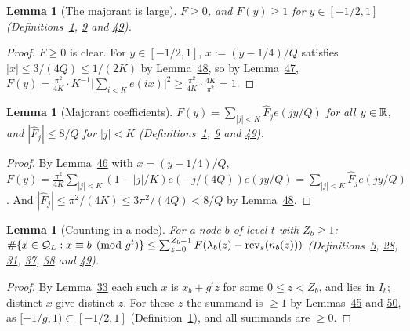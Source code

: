 \documentclass[11pt]{article}
\newcounter{hffc}
\theoremstyle{definition}\newtheorem{hffdef}[hffc]{Definition}
\theoremstyle{plain}\newtheorem{hfflem}[hffc]{Lemma}\newtheorem{hffthm}[hffc]{Theorem}
\theoremstyle{remark}\newtheorem{hffrem}[hffc]{Remark}
\newcommand{\hffcost}{}
\newcommand{\setcost}[1]{\renewcommand{\hffcost}{#1}}
\newcommand{\rev}{\operatorname{rev}}
\begin{document}
\begin{hfflem}[The majorant is large]\label{L:majlarge}
$F\ge0$, and $F(y)\ge1$ for $y\in[-1/2,1]$ (Definitions~\hyperref[D:conv]{1}, \hyperref[D:psi]{9} and \hyperref[D:maj]{49}).
\par\nopagebreak{}
\end{hfflem}
\begin{proof}\setcost{length 120/300}$F\ge0$ is clear. For $y\in[-1/2,1]$, $x:=(y-1/4)/Q$ satisfies $|x|\le3/(4Q)\le1/(2K)$ by Lemma~\hyperref[L:K]{48}, so by Lemma~\hyperref[L:fejerlow]{47}, $F(y)=\frac{\pi^2}{4K}\cdot K^{-1}\bigl|\sum_{i<K}e(ix)\bigr|^2\ge\frac{\pi^2}{4K}\cdot\frac{4K}{\pi^2}=1$.
\end{proof}

\begin{hfflem}[Majorant coefficients]\label{L:majcoef}
$F(y)=\sum_{|j|<K}\hat F_je(jy/Q)$ for all $y\in\mathbb{R}$, and $|\hat F_j|\le8/Q$ for $|j|<K$ (Definitions~\hyperref[D:conv]{1}, \hyperref[D:psi]{9} and \hyperref[D:maj]{49}).
\par\nopagebreak{}
\end{hfflem}
\begin{proof}\setcost{length 121/300}By Lemma~\hyperref[L:fejer]{46} with $x=(y-1/4)/Q$, $F(y)=\frac{\pi^2}{4K}\sum_{|j|<K}(1-|j|/K)e(-j/(4Q))e(jy/Q)=\sum_{|j|<K}\hat F_je(jy/Q)$. And $|\hat F_j|\le\pi^2/(4K)\le3\pi^2/(4Q)<8/Q$ by Lemma~\hyperref[L:K]{48}.
\end{proof}

\begin{hfflem}[Counting in a node]\label{L:innode}
For a node $b$ of level $t$ with $Z_b\ge1$: $\#\{x\in\cQ_L:x\equiv b\pmod{g^t}\}\le\sum_{z=0}^{Z_b-1}F(\lambda_b(z)-\rev_s(n_b(z)))$ (Definitions~\hyperref[D:digits]{3}, \hyperref[D:pal]{28}, \hyperref[D:node]{31}, \hyperref[D:phase]{37}, \hyperref[D:arch]{38} and \hyperref[D:maj]{49}).
\par\nopagebreak{}
\end{hfflem}
\begin{proof}\setcost{length 167/300}By Lemma~\hyperref[L:tree]{33} each such $x$ is $x_b+g^tz$ for some $0\le z<Z_b$, and lies in $I_b$; distinct $x$ give distinct $z$. For these $z$ the summand is $\ge1$ by Lemmas~\hyperref[L:local]{45} and \hyperref[L:majlarge]{50}, as $[-1/g,1)\subset[-1/2,1]$ (Definition~\hyperref[D:conv]{1}), and all summands are $\ge0$.
\end{proof}
\end{document}

